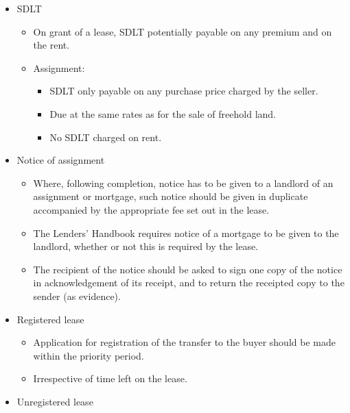 \documentclass[
]{article}
\providecommand{\tightlist}{%
  \setlength{\itemsep}{0pt}\setlength{\parskip}{0pt}}
\begin{document}
\begin{itemize}
\tightlist
\item
  SDLT

  \begin{itemize}
  \tightlist
  \item
    On grant of a lease, SDLT potentially payable on any premium and on
    the rent.
  \item
    Assignment:

    \begin{itemize}
    \tightlist
    \item
      SDLT only payable on any purchase price charged by the seller.
    \item
      Due at the same rates as for the sale of freehold land.
    \item
      No SDLT charged on rent.
    \end{itemize}
  \end{itemize}
\item
  Notice of assignment

  \begin{itemize}
  \tightlist
  \item
    Where, following completion, notice has to be given to a landlord of
    an assignment or mortgage, such notice should be given in duplicate
    accompanied by the appropriate fee set out in the lease.
  \item
    The Lenders' Handbook requires notice of a mortgage to be given to
    the landlord, whether or not this is required by the lease.
  \item
    The recipient of the notice should be asked to sign one copy of the
    notice in acknowledgement of its receipt, and to return the
    receipted copy to the sender (as evidence).
  \end{itemize}
\item
  Registered lease

  \begin{itemize}
  \tightlist
  \item
    Application for registration of the transfer to the buyer should be
    made within the priority period.
  \item
    Irrespective of time left on the lease.
  \end{itemize}
\item
  Unregistered lease


\end{itemize}
\end{document}
